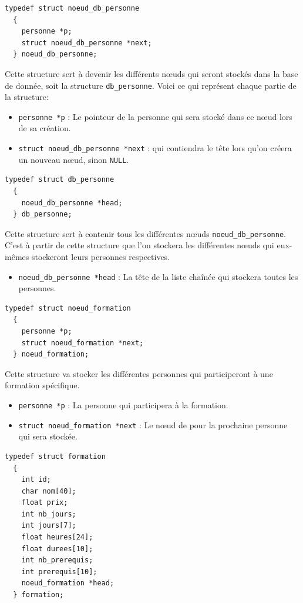 \documentclass[11pt]{article}
\begin{document}
\begin{lstlisting}[firstnumber=51]
  typedef struct noeud_db_personne
  {
    personne *p;
    struct noeud_db_personne *next;
  } noeud_db_personne;
\end{lstlisting}

Cette structure sert à devenir les différents n\oe{}uds qui seront stockés dans la base de donnée, soit la structure \texttt{db\_personne}.
Voici ce qui représent chaque partie de la structure:
\begin{itemize}
\item \texttt{personne *p} : Le pointeur de la personne qui sera stocké dans ce n\oe{}ud lors de sa création.
\item \texttt{struct noeud\_db\_personne *next} : qui contiendra le tête lors qu'on créera un nouveau n\oe{}ud, sinon \texttt{NULL}.
\end{itemize}

\begin{lstlisting}[firstnumber=63]
  typedef struct db_personne
  {
    noeud_db_personne *head;
  } db_personne;
\end{lstlisting}

Cette structure sert à contenir tous les différentes n\oe{}uds \texttt{noeud\_db\_personne}. C'est à partir de cette structure que l'on stockera les différentes n\oe{}uds qui eux-mêmes stockeront leurs personnes respectives.
\begin{itemize}
\item \texttt{noeud\_db\_personne *head} : La tête de la liste chaînée qui stockera toutes les personnes.
\end{itemize}

\begin{lstlisting}[firstnumber=73]
  typedef struct noeud_formation
  {
    personne *p;
    struct noeud_formation *next;
  } noeud_formation;
\end{lstlisting}

Cette structure va stocker les différentes personnes qui participeront à une formation spécifique.
\begin{itemize}
\item \texttt{personne *p} : La personne qui participera à la formation.
\item \texttt{struct noeud\_formation *next} : Le n\oe{}ud de pour la prochaine personne qui sera stockée.
\end{itemize}

\begin{lstlisting}[firstnumber=94]
  typedef struct formation
  {
    int id;
    char nom[40];
    float prix;
    int nb_jours;
    int jours[7];
    float heures[24];
    float durees[10];
    int nb_prerequis;
    int prerequis[10];
    noeud_formation *head;
  } formation;
\end{lstlisting}
\end{document}
